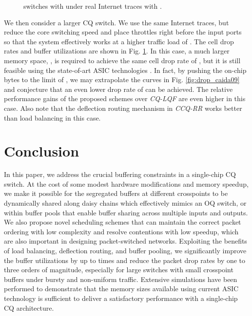 \documentclass[journal,final,doublecolumn,10pt,twoside]{IEEEtranTCOM} \normalsize
\begin{document}
\begin{figure}[ht]
\begin{minipage}[t]{3.2 in}
\centering {}
\end{minipage}
\begin{minipage}[t]{3.2 in}
\centering {}
\end{minipage}
\caption{ switches with  under real Internet traces with .}
\label{fig:128}
\end{figure}

We then consider a larger  CQ switch. We use the same Internet traces, but reduce the core switching speed and place throttles right before the input ports so that the system effectively works at a higher traffic load of . The cell drop rates and buffer utilizations are shown in Fig. \ref{fig:128}. In this case, a much larger memory space, , is required to achieve the same cell drop rate of , but it is still feasible using the state-of-art ASIC technologies \cite{asic01,asic02,asic03}. In fact, by pushing the on-chip bytes to the limit of , we may extrapolate the curves in Fig. \ref{fig:drop_caida09} and conjecture that an even lower drop rate of  can be achieved. The relative performance gains of the proposed schemes over \emph{CQ-LQF} are even higher in this case. Also note that the deflection routing mechanism in \emph{CCQ-RR} works better than load balancing in this case.




\section{Conclusion}
\label{sec:conclusion}
In this paper, we address the crucial buffering constraints in a single-chip CQ switch. At the cost of some modest hardware modifications and memory speedup, we make it possible for the segregated buffers at different crosspoints to be dynamically shared along daisy chains which effectively mimics an OQ switch, or within buffer pools that enable buffer sharing across multiple inputs and outputs. We also propose novel scheduling schemes that can maintain the correct packet ordering with low complexity and resolve contentions with low speedup, which are also important in designing packet-switched networks. Exploiting the benefits of load balancing, deflection routing, and buffer pooling, we significantly improve the buffer utilizations by up to  times and reduce the packet drop rates by one to three orders of magnitude, especially for large switches with small crosspoint buffers under bursty and non-uniform traffic. Extensive simulations have been performed to demonstrate that the memory sizes available using current ASIC technology is sufficient to deliver a satisfactory performance with a single-chip CQ architecture.
\end{document}
